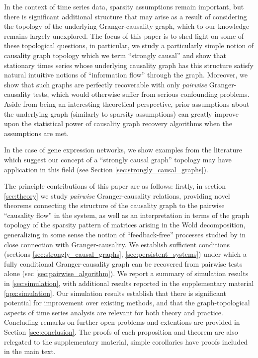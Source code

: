 \documentclass{statsoc}
\begin{document}

In the context of time series data, sparsity assumptions remain
important, but there is significant additional structure that may
arise as a result of considering the topology of the underlying
Granger-causality graph, which to our knowledge remains largely
unexplored.  The focus of this paper is to shed light on some of these
topological questions, in particular, we study a particularly simple
notion of causality graph topology which we term ``strongly causal''
and show that stationary times series whose underlying causality graph
has this structure satisfy natural intuitive notions of ``information
flow'' through the graph.  Moreover, we show that such graphs are
perfectly recoverable with only \textit{pairwise} Granger-causality
tests, which would otherwise suffer from serious confounding problems.
Aside from being an interesting theoretical perspective, prior
assumptions about the underlying graph (similarly to sparsity
assumptions) can greatly improve upon the statistical power of
causality graph recovery algorithms when the assumptions are met.

In the case of gene expression networks, we show examples from the
literature which suggest our concept of a ``strongly causal graph''
topology may have application in this field (see Section
\ref{sec:strongly_causal_graphs}).

The principle contributions of this paper are as follows: firstly, in
section \ref{sec:theory} we study \textit{pairwise} Granger-causality
relations, providing novel theorems connecting the structure of the
causality graph to the pairwise ``causality flow'' in the system, as
well as an interpretation in terms of the graph topology of the
sparsity pattern of matrices arising in the Wold decomposition,
generalizing in some sense the notion of ``feedback-free'' processes
studied by \cite{caines1975feedback} in close connection with
Granger-causality.  We establish sufficient conditions (sections
\ref{sec:strongly_causal_graphs}, \ref{sec:persistent_systems}) under
which a fully conditional Granger-causality graph can be recovered
from pairwise tests alone (sec \ref{sec:pairwise_algorithm}).  We
report a summary of simulation results in \ref{sec:simulation}, with
additional results reported in the supplementary material
\ref{apx:simulation}.  Our simulation results establish that there is
significant potential for improvement over existing methods, and that
the graph-topological aspects of time series analysis are relevant for
both theory and practice.  Concluding remarks on further open problems
and extentions are provided in Section \ref{sec:conclusion}.  The
proofs of each proposition and theorem are also relegated to the
supplementary material, simple corollaries have proofs included in the
main text.
\end{document}

